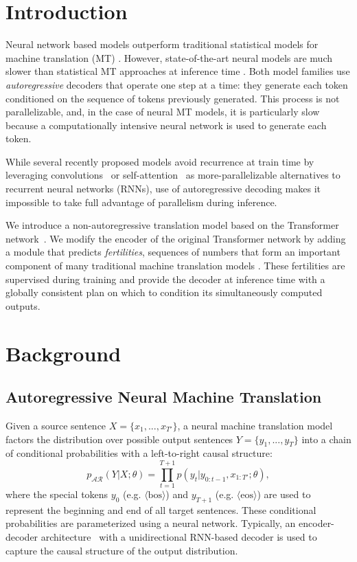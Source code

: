 \def \model{NAT}

\section{Introduction}
Neural network based models outperform traditional statistical models for machine translation (MT) \citep{bahdanau2014neural,luong2015effective}. 
However, state-of-the-art neural models are much slower than statistical MT approaches at inference time \citep{wu2016google}.
Both model families use \emph{autoregressive} decoders that operate one step at a time: they generate each token conditioned on the sequence of tokens previously generated. This process is not parallelizable, and, in the case of neural MT models, it is particularly slow because a computationally intensive neural network is used to generate each token.

While several recently proposed models avoid recurrence at train time by leveraging convolutions~\citep{kalchbrenner2016neural, gehring2017convolutional, kaiser2017depthwise} or self-attention~\citep{vaswani2017attention} as more-parallelizable alternatives to recurrent neural networks (RNNs), use of autoregressive decoding makes it impossible to take full advantage of parallelism during inference.

We introduce a non-autoregressive translation model based on the Transformer network~\citep{vaswani2017attention}. We modify the encoder of the original Transformer network by adding a module that predicts \emph{fertilities}, sequences of numbers that form an important component of many traditional machine translation models \citep{brown1993mathematics}.
These fertilities are supervised during training and provide the decoder at inference time with a globally consistent plan on which to condition its simultaneously computed outputs.

\section{Background}
\subsection{Autoregressive Neural Machine Translation}
Given a source sentence $X=\{x_1, ..., x_{T'}\}$, a neural machine translation model factors the distribution over possible output sentences $Y=\{y_1, ..., y_T\}$ into a chain of conditional probabilities with a left-to-right causal structure:
\begin{equation}
p_{\mathcal{AR}}(Y|X; \theta) = \prod_{t=1}^{T+1} p(y_t| y_{0:t-1}, x_{1:T'}; \theta),
\end{equation}
where the special tokens $y_0$ (e.g. $\langle \mathrm{bos}\rangle$) and $y_{T+1}$ (e.g. $\langle \mathrm{eos}\rangle$) are used to represent the beginning and end of all target sentences.
These conditional probabilities are parameterized using a neural network. Typically, an encoder-decoder architecture~\citep{sutskever2014sequence} with a unidirectional RNN-based decoder is used to capture the causal structure of the output distribution.

